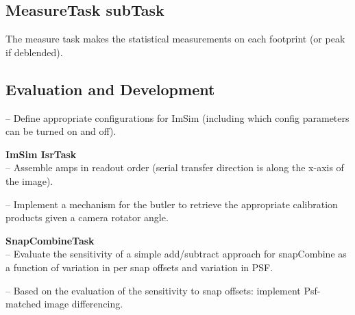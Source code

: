 \documentclass[prd, nofootinbib, floatfix, 11pt,tightenlines,times]{article}
\begin{document}
\subsection{MeasureTask subTask}
The measure task makes the statistical measurements on each footprint (or peak if deblended).

\subsection{Evaluation and Development}

-- Define appropriate configurations for ImSim (including which config
parameters can be turned on and off).

{\bf ImSim IsrTask}\\
-- Assemble amps in readout order (serial transfer direction is along the x-axis of the image).



-- Implement a mechanism for the butler to retrieve the appropriate calibration products given a camera rotator angle.

{\bf SnapCombineTask}\\
-- Evaluate the sensitivity of a simple add/subtract approach for
snapCombine as a function of variation in per snap offsets and
variation in PSF. 

-- Based on the evaluation of the sensitivity to snap offsets:
implement Psf-matched image differencing.
\end{document}
